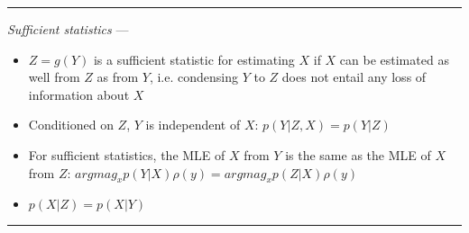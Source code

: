{\color{lightgray}\hrule height 0.001mm}

\emph{Sufficient statistics} --- 
\begin{itemize}
    \item $Z=g(Y)$ is a sufficient statistic for estimating $X$ if $X$ can be estimated as well from $Z$ as from $Y$, i.e. condensing $Y$ to $Z$ does not entail any loss of information about $X$
    \item Conditioned on $Z$, $Y$ is independent of $X$: $p(Y|Z,X) = p(Y|Z)$
    \item For sufficient statistics, the MLE of $X$ from $Y$ is the same as the MLE of $X$ from $Z$: $argmag_x p(Y|X) \rho(y) = argmag_x p(Z|X) \rho(y)$
    \item $p(X|Z) = p(X|Y)$
    
\end{itemize}

{\color{black}\hrule height 0.001mm}

